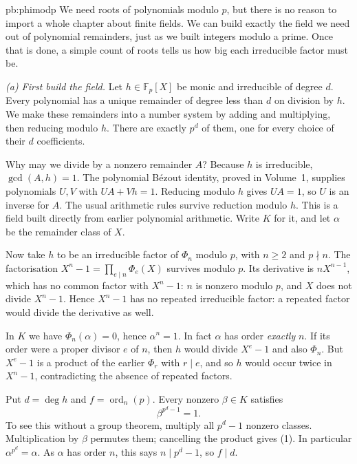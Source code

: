 \begin{solution}{pb:phimodp}
\idea We need roots of polynomials modulo $p$, but there is
no reason to import a whole chapter about finite fields.
We can build exactly the field we need out of polynomial
remainders, just as we built integers modulo a prime.
Once that is done, a simple count of roots tells us
how big each irreducible factor must be.

\writeup
\emph{(a) First build the field.}
Let $h\in\mathbb F_p[X]$ be monic and irreducible
of degree $d$. Every polynomial has a unique remainder
of degree less than $d$ on division by $h$.
We make these remainders into a number system by
adding and multiplying, then reducing modulo $h$.
There are exactly $p^d$ of them, one for every choice
of their $d$ coefficients.

Why may we divide by a nonzero remainder $A$?
Because $h$ is irreducible, $\gcd(A,h)=1$.
The polynomial B\'ezout identity, proved in Volume~1,
supplies polynomials $U,V$ with $UA+Vh=1$.
Reducing modulo $h$ gives $UA=1$, so $U$ is
an inverse for $A$. The usual arithmetic rules
survive reduction modulo $h$. This is a field
built directly from earlier polynomial arithmetic.
Write $K$ for it, and let $\alpha$ be the
remainder class of $X$.

Now take $h$ to be an irreducible factor of
$\Phi_n$ modulo $p$, with $n\ge2$ and $p\nmid n$.
The factorisation
$X^n-1=\prod_{e\mid n}\Phi_e(X)$ survives modulo $p$.
Its derivative is $nX^{n-1}$, which has no common
factor with $X^n-1$: $n$ is nonzero modulo $p$,
and $X$ does not divide $X^n-1$.
Hence $X^n-1$ has no repeated irreducible factor:
a repeated factor would divide the derivative as well.

In $K$ we have $\Phi_n(\alpha)=0$, hence
$\alpha^n=1$.
In fact $\alpha$ has order \emph{exactly} $n$.
If its order were a proper divisor $e$ of $n$,
then $h$ would divide $X^e-1$ and also $\Phi_n$.
But $X^e-1$ is a product of the earlier
$\Phi_r$ with $r\mid e$, and so $h$ would
occur twice in $X^n-1$, contradicting
the absence of repeated factors.

Put $d=\deg h$ and $f=\operatorname{ord}_n(p)$.
Every nonzero $\beta\in K$ satisfies
\[
\beta^{p^d-1}=1.                                      \tag{1}
\]
To see this without a group theorem, multiply
all $p^d-1$ nonzero classes. Multiplication by
$\beta$ permutes them; cancelling the product
gives (1). In particular $\alpha^{p^d}=\alpha$.
As $\alpha$ has order $n$, this says
$n\mid p^d-1$, so $f\mid d$.


\end{solution}
